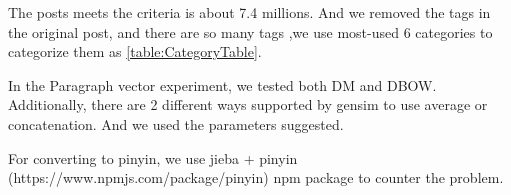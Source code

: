 The posts meets the criteria is about 7.4 millions. And we removed the tags in the original post, and there are so many tags 
,we use most-used 6 categories to categorize them as \ref{table:CategoryTable}.

In the Paragraph vector experiment, we tested both DM and DBOW. Additionally, there are 2 different ways supported by gensim to use average or concatenation.
And we used the parameters suggested. 


For converting to pinyin, we use jieba + pinyin (https://www.npmjs.com/package/pinyin) npm package to counter the problem.
